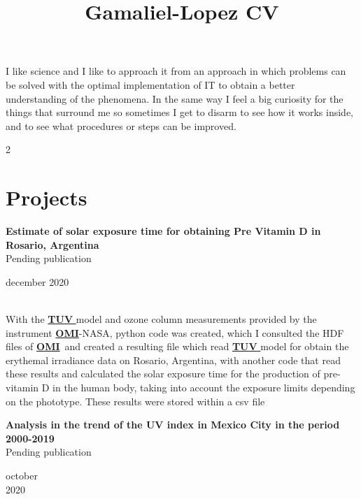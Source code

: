 \documentclass[a3paper,16pt]{adcv}
\title{Gamaliel-Lopez CV}
\newcommand*{\tuv}{\href{https://www2.acom.ucar.edu/modeling/tropospheric-ultraviolet-and-visible-tuv-radiation-model}{\textbf{TUV }}}
\newcommand*{\omi}{\href{https://aura.gsfc.nasa.gov/omi.html}{\textbf{OMI}}}
\begin{document}
\changefontsizes{14.5pt}
I like science and I like to approach it from an approach in which problems can be solved with the optimal implementation of IT to obtain a better understanding of the phenomena. In the same way I feel a big curiosity for the things that surround me so sometimes I get to disarm 
to see how it works inside, and to see what procedures or steps can be improved.
\begin{multicols}{2}
\section{Projects}

\begin{minipage}{0.8\linewidth}
  \textbf{Estimate of solar exposure time for obtaining Pre Vitamin D in Rosario, Argentina}\\
  Pending publication
\end{minipage}
  \begin{minipage}{0.2\linewidth}
    \begin{flushright}
    \vspace{-0.8cm}
    december 2020
    \end{flushright}
  \end{minipage}\\

  With the \tuv model and ozone column measurements provided by the instrument \omi-NASA, python code was created, which
  I consulted the HDF files of \omi~and created a resulting file which read \tuv model for obtain the erythemal irradiance data
   on Rosario, Argentina, with another code that read these results and calculated the solar exposure time for 
   the production of pre-vitamin D in the human body, taking into account the exposure limits depending on the phototype.
    These results were stored within a csv file
 \\

  \begin{minipage}{0.8\linewidth}
    \textbf{Analysis in the trend of the UV index in Mexico City in the period 2000-2019}\\ 
    Pending publication
  \end{minipage}
    \begin{minipage}{0.2\linewidth}
      \begin{flushright}
        \vspace{-0.7cm}
      october\\ 2020
      \end{flushright}
    \end{minipage}\\
    

\end{multicols}
\end{document}
